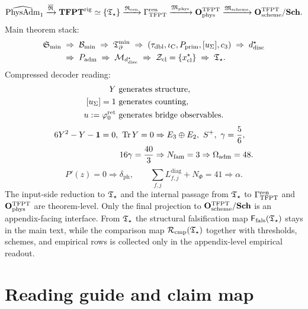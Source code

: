 \begin{tcolorbox}[colback=tfptblue!2, colframe=tfptblue!40, breakable,
    title={Closed architecture of the paper}, colbacktitle=tfptblue!60]
\[
\widehat{\mathrm{PhysAdm}}_1
\xrightarrow{\overline{\mathfrak R}}
\mathbf{TFPT}^{\mathrm{rig}}
\simeq
\{\mathfrak T_{\star}\}
\xrightarrow{\mathfrak R_{\mathrm{ren}}}
\Gamma_{\mathrm{TFPT}}^{\mathrm{ren}}
\xrightarrow{\mathfrak M_{\mathrm{phys}}}
\mathbf O_{\mathrm{phys}}^{\mathrm{TFPT}}
\xrightarrow{\mathfrak M_{\mathrm{scheme}}}
\mathbf O_{\mathrm{scheme}}^{\mathrm{TFPT}}/\mathbf{Sch}.
\]
Main theorem stack:
\[
\begin{aligned}
\mathfrak S_{\min}
&\;\Rightarrow\;
\mathcal B_{\min}
\;\Rightarrow\;
\mathfrak T_{\partial}^{\min}
\;\Rightarrow\;
(\tau_{\mathrm{dbl}},\iota_{\mathrm C},P_{\mathrm{prim}},[u_\Sigma],c_3)
\;\Rightarrow\;
d^\star_{\mathrm{disc}}
\\
&\;\Rightarrow\;
P_{\mathrm{adm}}
\;\Rightarrow\;
\mathcal M_{d^\star_{\mathrm{disc}}}
\;\Rightarrow\;
\mathcal Z_{\mathrm{cl}}=\{x^\star_{\mathrm{cl}}\}
\;\Rightarrow\;
\mathfrak T_{\star}.
\end{aligned}
\]
Compressed decoder reading:
\[
\begin{aligned}
Y&\ \text{generates structure},\\
[u_\Sigma]=1&\ \text{generates counting},\\
u:=\varphi_0^{\mathrm{ret}}&\ \text{generates bridge observables}.
\end{aligned}
\]
\[
\begin{aligned}
6Y^2-Y-\mathbf 1=0,\ \operatorname{Tr} Y=0
&\Rightarrow
E_3\oplus E_2,\ S^+,\ \gamma=\frac56,\\
16\gamma=\frac{40}{3}
&\Rightarrow
N_{\mathrm{fam}}=3
\Rightarrow
\Omega_{\mathrm{adm}}=48.
\end{aligned}
\]
\[
P'(z)=0
\Rightarrow
\delta_{\mathrm{ph}},
\qquad
\sum_{f,j}L_{f,j}^{\mathrm{diag}}+N_\Phi=41
\Rightarrow
\alpha.
\]
The input-side reduction to $\mathfrak T_{\star}$ and the internal passage from $\mathfrak T_{\star}$ to $\Gamma_{\mathrm{TFPT}}^{\mathrm{ren}}$ and
$\mathbf O_{\mathrm{phys}}^{\mathrm{TFPT}}$ are theorem-level. Only the final projection to $\mathbf O_{\mathrm{scheme}}^{\mathrm{TFPT}}/\mathbf{Sch}$ is an
appendix-facing interface. From $\mathfrak T_{\star}$ the structural falsification map $\mathsf F_{\mathrm{fals}}(\mathfrak T_{\star})$ stays in
the main text, while the comparison map $\mathcal R_{\mathrm{cmp}}(\mathfrak T_{\star})$ together with thresholds, schemes, and
empirical rows is collected only in the appendix-level empirical readout.
\end{tcolorbox}

\tableofcontents

\section{Reading guide and claim map}


